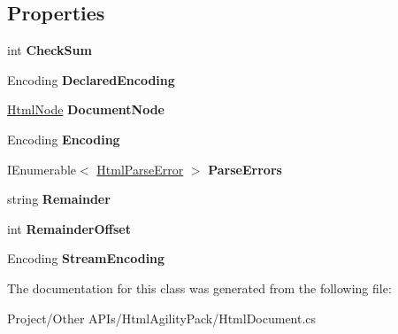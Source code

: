 \subsection*{Properties}
\begin{DoxyCompactItemize}
\item 
\mbox{\label{class_html_agility_pack_1_1_html_document_aaceb2c1640bc7e8ad19736dbe7023b46}} 
int {\bfseries Check\+Sum}
\item 
\mbox{\label{class_html_agility_pack_1_1_html_document_a30aefe9e05745898b500f93a3a43df5a}} 
Encoding {\bfseries Declared\+Encoding}
\item 
\mbox{\label{class_html_agility_pack_1_1_html_document_a85eaf47c876d64dac9c5249f477006ae}} 
\hyperlink{class_html_agility_pack_1_1_html_node}{Html\+Node} {\bfseries Document\+Node}
\item 
\mbox{\label{class_html_agility_pack_1_1_html_document_a220bdf28a5e35f4898075084be2d59f0}} 
Encoding {\bfseries Encoding}
\item 
\mbox{\label{class_html_agility_pack_1_1_html_document_ac2054351171c65da329218a8cbd610f9}} 
I\+Enumerable$<$ \hyperlink{class_html_agility_pack_1_1_html_parse_error}{Html\+Parse\+Error} $>$ {\bfseries Parse\+Errors}
\item 
\mbox{\label{class_html_agility_pack_1_1_html_document_a2ccaa3304dba0dc11d2e86582f98247e}} 
string {\bfseries Remainder}
\item 
\mbox{\label{class_html_agility_pack_1_1_html_document_a8d46363b2c1cfa924406eb30c69fcf73}} 
int {\bfseries Remainder\+Offset}
\item 
\mbox{\label{class_html_agility_pack_1_1_html_document_a6fb094d01a9a36494a0cbeadb80def06}} 
Encoding {\bfseries Stream\+Encoding}
\end{DoxyCompactItemize}


The documentation for this class was generated from the following file\+:\begin{DoxyCompactItemize}
\item 
Project/\+Other A\+P\+Is/\+Html\+Agility\+Pack/Html\+Document.\+cs\end{DoxyCompactItemize}
